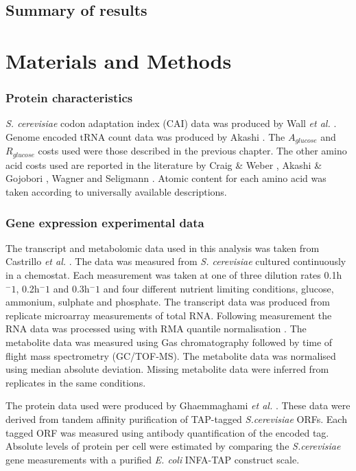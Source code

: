 \subsection{Summary of results}

\clearpage

\section{Materials and Methods}

\subsubsection{Protein characteristics}

\emph{S. cerevisiae} codon adaptation index (CAI) data was produced by Wall \emph{et al.} \cite{wall2005}. Genome encoded tRNA count data was produced by Akashi \cite{akashi_trna}. The $A_{glucose}$ and $R_{glucose}$ costs used were those described in the previous chapter. The other amino acid costs used are reported in the literature by Craig \& Weber \cite{craig1998}, Akashi \& Gojobori \cite{akashi2002}, Wagner \cite{wagner2005} and Seligmann \cite{seligmann2004}. Atomic content for each amino acid was taken according to universally available descriptions.

\subsubsection{Gene expression experimental data}

The transcript and metabolomic data used in this analysis was taken from Castrillo \emph{et al.} \cite{castrillo2007}. The data was measured from \emph{S. cerevisiae} cultured continuously in a chemostat. Each measurement was taken at one of three dilution rates 0.1h$^-1$, 0.2h$^-1$ and 0.3h$^-1$ and four different nutrient limiting conditions, glucose, ammonium, sulphate and phosphate. The transcript data was produced from replicate microarray measurements of total RNA. Following measurement the RNA data was processed using with RMA quantile normalisation \cite{RMA}. The metabolite data was measured using Gas chromatography followed by time of flight mass spectrometry (GC/TOF-MS). The metabolite data was normalised using median absolute deviation. Missing metabolite data were inferred from replicates in the same conditions.

The protein data used were produced by Ghaemmaghami \emph{et al.} \cite{ghaemmaghami2003}. These data were derived from tandem affinity purification of TAP-tagged \emph{S.cerevisiae} ORFs. Each tagged ORF was measured using antibody quantification of the encoded tag. Absolute levels of protein per cell were estimated by comparing the \emph{S.cerevisiae} gene measurements with a purified \emph{E. coli} INFA-TAP construct scale.

